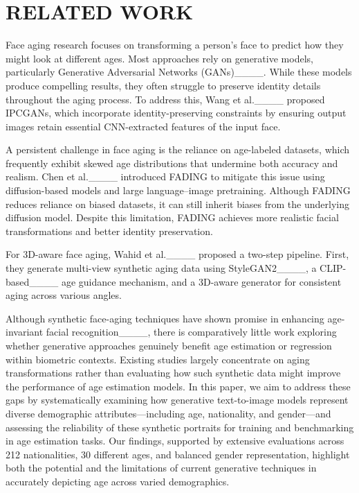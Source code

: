 \section{RELATED WORK}
\label{sec:related_work}

Face aging research focuses on transforming a person’s face to predict how they might look at different ages. Most approaches rely on generative models, particularly Generative Adversarial Networks (GANs)____. While these models produce compelling results, they often struggle to preserve identity details throughout the aging process. To address this, Wang et al.____ proposed IPCGANs, which incorporate identity-preserving constraints by ensuring output images retain essential CNN-extracted features of the input face.

A persistent challenge in face aging is the reliance on age-labeled datasets, which frequently exhibit skewed age distributions that undermine both accuracy and realism. Chen et al.____ introduced FADING to mitigate this issue using diffusion-based models and large language–image pretraining. Although FADING reduces reliance on biased datasets, it can still inherit biases from the underlying diffusion model. Despite this limitation, FADING achieves more realistic facial transformations and better identity preservation.

For 3D-aware face aging, Wahid et al.____ proposed a two-step pipeline. First, they generate multi-view synthetic aging data using StyleGAN2____, a CLIP-based____ age guidance mechanism, and a 3D-aware generator for consistent aging across various angles. 

Although synthetic face-aging techniques have shown promise in enhancing age-invariant facial recognition____, there is comparatively little work exploring whether generative approaches genuinely benefit age estimation or regression within biometric contexts. Existing studies largely concentrate on aging transformations rather than evaluating how such synthetic data might improve the performance of age estimation models. In this paper, we aim to address these gaps by systematically examining how generative text-to-image models represent diverse demographic attributes—including age, nationality, and gender—and assessing the reliability of these synthetic portraits for training and benchmarking in age estimation tasks. Our findings, supported by extensive evaluations across 212 nationalities, 30 different ages, and balanced gender representation, highlight both the potential and the limitations of current generative techniques in accurately depicting age across varied demographics.


